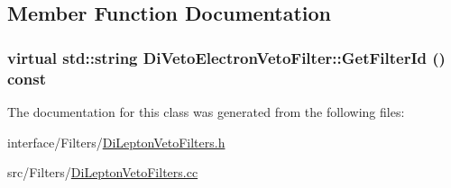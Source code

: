 \subsection{Member Function Documentation}
\hypertarget{classDiVetoElectronVetoFilter_a934bd59f2ff487fb7346ea560d4ab134}{
\subsubsection[{GetFilterId}]{\setlength{\rightskip}{0pt plus 5cm}virtual std::string DiVetoElectronVetoFilter::GetFilterId () const}}
\label{classDiVetoElectronVetoFilter_a934bd59f2ff487fb7346ea560d4ab134}


The documentation for this class was generated from the following files:\begin{DoxyCompactItemize}
\item 
interface/Filters/\hyperlink{DiLeptonVetoFilters_8h}{DiLeptonVetoFilters.h}\item 
src/Filters/\hyperlink{DiLeptonVetoFilters_8cc}{DiLeptonVetoFilters.cc}\end{DoxyCompactItemize}
